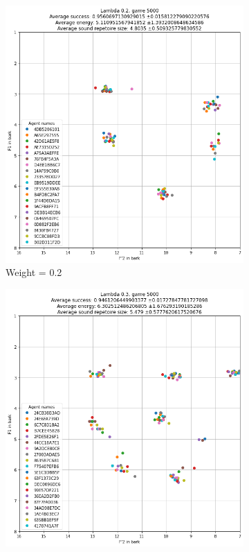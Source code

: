 \begin{figure}[ht]
\begin{subfigure}{.30\textwidth}
        \centering
        \includegraphics[width=\textwidth]{images/extra/bark_weight_2.png}
        \captionsetup{width=0.9\linewidth}
        \captionsetup{justification=centering}
        \caption{Weight = 0.2}
    \end{subfigure}
    \hspace{0.5cm}
    \begin{subfigure}{.30\textwidth}
        \centering
        \includegraphics[width=\textwidth]{images/extra/bark_weight_3.png}

\end{subfigure}
\end{figure}
